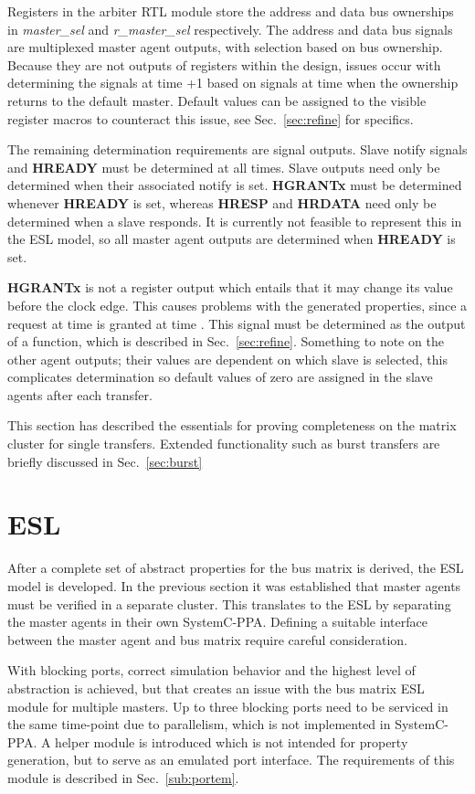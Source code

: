Registers in the arbiter RTL module store the address and data bus ownerships in \textit{master\_sel} and \textit{r\_master\_sel} respectively. The address and data bus signals are multiplexed master agent outputs, with selection based on bus ownership. Because they are not outputs of registers within the design, issues occur with determining the signals at time +1 based on signals at time  when the ownership returns to the default master. Default values can be assigned to the visible register macros to counteract this issue, see Sec.~\ref{sec:refine} for specifics. \par
The remaining determination requirements are signal outputs. Slave notify signals and \textbf{HREADY} must be determined at all times. Slave outputs need only be determined when their associated notify is set. \textbf{HGRANTx} must be determined whenever \textbf{HREADY} is set, whereas \textbf{HRESP} and \textbf{HRDATA} need only be determined when a slave responds. It is currently not feasible to represent this in the ESL model, so all master agent outputs are determined when \textbf{HREADY} is set. \par
\textbf{HGRANTx} is not a register output which entails that it may change its value before the clock edge. This causes problems with the generated properties, since a request at time  is granted at time . This signal must be determined as the output of a function, which is described in Sec.~\ref{sec:refine}. Something to note on the other agent outputs; their values are dependent on which slave is selected, this complicates determination so default values of zero are assigned in the slave agents after each transfer. \par
This section has described the essentials for proving completeness on the matrix cluster for single transfers. Extended functionality such as burst transfers are briefly discussed in Sec.~\ref{sec:burst}
 

\section{ESL}
After a complete set of abstract properties for the bus matrix is derived, the ESL model is developed. In the previous section it was established that master agents must be verified in a separate cluster. This translates to the ESL by separating the master agents in their own SystemC-PPA. Defining a suitable interface between the master agent and bus matrix require careful consideration. \par
With blocking ports, correct simulation behavior and the highest level of abstraction is achieved, but that creates an issue with the bus matrix ESL module for multiple masters. Up to three blocking ports need to be serviced in the same time-point due to parallelism, which is not implemented in SystemC-PPA. A helper module is introduced which is not intended for property generation, but to serve as an emulated port interface. The requirements of this module is described in Sec.~\ref{sub:portem}.

